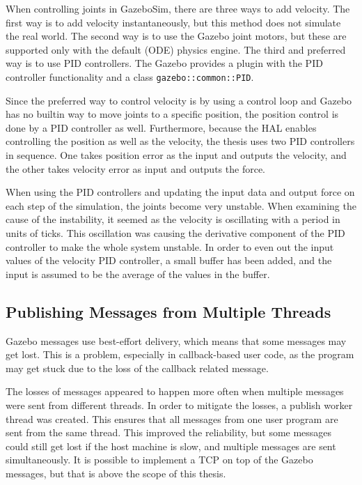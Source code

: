 \documentclass[
  printed, %
  color,   %
  notable, %
  oneside, %
  nolof,   %
  nolot,   %
  nocover,
]{fithesis3}
\newcommand{\code}[1]{\texttt{#1}}
\begin{document}
When controlling joints in GazeboSim, there are three ways to add velocity.
The first way is to add velocity instantaneously, but this method does not simulate the real world.
The second way is to use the Gazebo joint motors, but these are supported only with the default (ODE) physics engine.
The third and preferred way is to use PID controllers.
The Gazebo provides a plugin with the PID controller functionality and a class \code{gazebo::common::PID}.

Since the preferred way to control velocity is by using a control loop and Gazebo has no builtin way to move joints to a specific position, the position control is done by a PID controller as well.
Furthermore, because the HAL enables controlling the position as well as the velocity, the thesis uses two PID controllers in sequence.
One takes position error as the input and outputs the velocity, and the other takes velocity error as input and outputs the force.

When using the PID controllers and updating the input data and output force on each step of the simulation, the joints become very unstable.
When examining the cause of the instability, it seemed as the velocity is oscillating with a period in units of ticks.
This oscillation was causing the derivative component of the PID controller to make the whole system unstable.
In order to even out the input values of the velocity PID controller, a small buffer has been added, and the input is assumed to be the average of the values in the buffer.

\subsection{Publishing Messages from Multiple Threads}

Gazebo messages use best-effort delivery, which means that some messages may get lost.
This is a problem, especially in callback-based user code, as the program may get stuck due to the loss of the callback related message.

The losses of messages appeared to happen more often when multiple messages were sent from different threads.
In order to mitigate the losses, a publish worker thread was created.
This ensures that all messages from one user program are sent from the same thread.
This improved the reliability, but some messages could still get lost if the host machine is slow, and multiple messages are sent simultaneously.
It is possible to implement a TCP on top of the Gazebo messages, but that is above the scope of this thesis.
\end{document}
